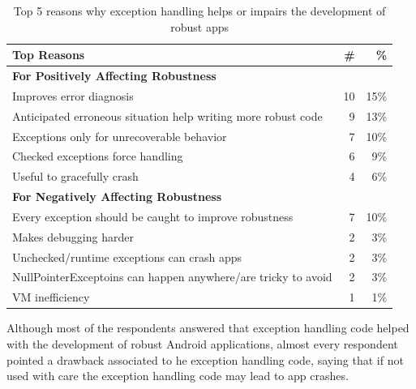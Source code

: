 \begin{table}
\scriptsize
\centering
\begin{tabular}{lrr}
\hline
\bfseries{Top Reasons} & \bfseries{\#} & \bfseries{\%} \\
\hline
\bfseries{For Positively Affecting Robustness} &   &   \\
Improves error diagnosis  &	10	& 15\% \\
Anticipated erroneous situation help writing more robust code  & 9	 & 13\% \\ 
Exceptions only for unrecoverable behavior	& 7 &	10\% \\
Checked exceptions force handling  &	6	& 9\% \\
Useful to gracefully crash 	& 4 &	6\% \\
		
\bfseries{For Negatively Affecting Robustness} &   &   \\
Every exception should be caught to improve robustness	& 7	& 10\% \\
Makes debugging harder &	2 &	3\% \\
Unchecked/runtime exceptions can crash apps & 2	& 3\% \\
NullPointerExceptoins can happen anywhere/are tricky to avoid	 & 2	& 3\% \\
VM inefficiency 	& 1 & 1\% \\

\hline
\end{tabular}
\caption{Top 5 reasons why exception handling helps or impairs the development of robust apps}
\label{tab:topreasons}
\end{table}


Although most of the respondents answered that exception handling code helped with the development of robust Android applications, almost every respondent pointed a drawback associated to he exception handling code, saying that if not used with care the exception handling code may lead to app crashes.  



